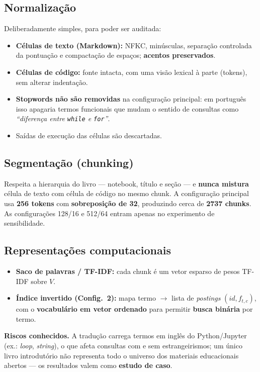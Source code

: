 \documentclass[11pt,a4paper]{article}
\begin{document}
\subsection{Normalização}
Deliberadamente simples, para poder ser auditada:
\begin{itemize}[leftmargin=1.4em,itemsep=2pt]
\item \textbf{Células de texto (Markdown):} NFKC, minúsculas, separação controlada da pontuação e
compactação de espaços; \textbf{acentos preservados}.
\item \textbf{Células de código:} fonte intacta, com uma visão lexical à parte (tokens), sem alterar indentação.
\item \textbf{Stopwords não são removidas} na configuração principal: em português isso apagaria termos
funcionais que mudam o sentido de consultas como \emph{``diferença entre \texttt{while} e \texttt{for}''}.
\item Saídas de execução das células são descartadas.
\end{itemize}

\subsection{Segmentação (chunking)}
Respeita a hierarquia do livro --- notebook, título e seção --- e \textbf{nunca mistura} célula de
texto com célula de código no mesmo chunk. A configuração principal usa \textbf{256 tokens} com
\textbf{sobreposição de 32}, produzindo cerca de \textbf{2737 chunks}. As configurações 128/16 e
512/64 entram apenas no experimento de sensibilidade.

\subsection{Representações computacionais}
\begin{itemize}[leftmargin=1.4em,itemsep=2pt]
\item \textbf{Saco de palavras / TF-IDF:} cada chunk é um vetor esparso de pesos TF-IDF sobre $V$.
\item \textbf{Índice invertido (Config.~2):} mapa termo $\to$ lista de \emph{postings} $(id, f_{t,c})$,
com o \textbf{vocabulário em vetor ordenado} para permitir \textbf{busca binária} por termo.
\end{itemize}
\begin{nota}
\textbf{Riscos conhecidos.} A tradução carrega termos em inglês do Python/Jupyter (ex.: \emph{loop},
\emph{string}), o que afeta consultas com e sem estrangeirismos; um único livro introdutório não
representa todo o universo dos materiais educacionais abertos --- os resultados valem como
\textbf{estudo de caso}.
\end{nota}
\end{document}

